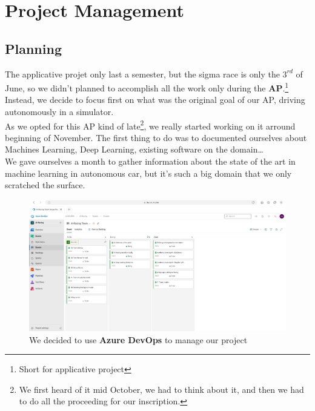 \section{Project Management}
\subsection{Planning}

The applicative projet only last a semester, but the sigma race is only the $3^{rd}$ of June, so we didn't planned to accomplish all the work only during the \textbf{AP}.\footnote{Short for applicative project} Instead, we decide to focus first on what was the original goal of our AP, driving autonomously in a simulator.\\

As we opted for this AP kind of late\footnote{We first heard of it mid October, we had to think about it, and then we had to do all the proceeding for our inscription.}, we really started working on it arround beginning of November. The first thing to do was to documented ourselves about Machines Learning, Deep Learning, existing software on the domain\dots\\
We gave ourselves a month to gather information about the state of the art in machine learning in autonomous car, but it's such a big domain that we only scratched the surface.


\begin{figure}[!h]
\centering
\includegraphics[scale=0.24]{img/devops.jpg}
\caption{We decided to use \textbf{Azure DevOps} to manage our project}
\end{figure}



